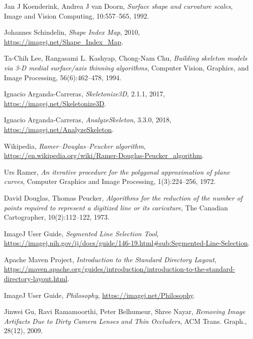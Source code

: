 \documentclass[declaration,shortabstract,mgr]{iithesis}
\begin{document}
\begin{thebibliography}{1}
  Jan J Koenderink, Andrea J van Doorn,
  \emph{Surface shape and curvature scales},
  Image and Vision Computing,
  10:557--565,
  1992.

  Johannes Schindelin,
  \emph{Shape Index Map},
  2010,
  \url{https://imagej.net/Shape_Index_Map}.

  Ta-Chih Lee, Rangasami L. Kashyap, Chong-Nam Chu,
  \emph{Building skeleton models via 3-D medial surface/axis thinning algorithms},
  Computer Vision, Graphics, and Image Processing,
  56(6):462--478,
  1994.

  Ignacio Arganda-Carreras,
  \emph{Skeletonize3D},
  2.1.1,
  2017,
  \url{https://imagej.net/Skeletonize3D}.

  Ignacio Arganda-Carreras,
  \emph{AnalyzeSkeleton},
  3.3.0,
  2018,
  \url{https://imagej.net/AnalyzeSkeleton}.

  Wikipedia,
  \emph{Ramer--Douglas--Peucker algorithm},
  \url{https://en.wikipedia.org/wiki/Ramer-Douglas-Peucker_algorithm}.

  Urs Ramer,
  \emph{An iterative procedure for the polygonal approximation of plane curves},
  Computer Graphics and Image Processing,
  1(3):224–256,
  1972.

  David Douglas, Thomas Peucker,
  \emph{Algorithms for the reduction of the number of points required to represent a digitized line or its caricature},
  The Canadian Cartographer,
  10(2):112–122,
  1973.

  ImageJ User Guide,
  \emph{Segmented Line Selection Tool},
  \url{https://imagej.nih.gov/ij/docs/guide/146-19.html#sub:Segmented-Line-Selection}.

  Apache Maven Project,
  \emph{Introduction to the Standard Directory Layout},
  \url{https://maven.apache.org/guides/introduction/introduction-to-the-standard-directory-layout.html}.

  ImageJ User Guide,
  \emph{Philosophy},
  \url{https://imagej.net/Philosophy}.

  Jinwei Gu, Ravi Ramamoorthi, Peter Belhumeur, Shree Nayar,
  \emph{Removing Image Artifacts Due to Dirty Camera Lenses and Thin Occluders},
  ACM Trans. Graph.,
  28(12),
  2009.

\end{thebibliography}
\end{document}
